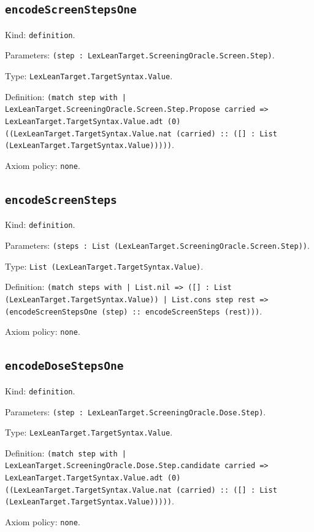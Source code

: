 \documentclass[11pt]{article}
\begin{document}
\subsection*{\texttt{encodeScreenStepsOne}}
\noindent Kind: \texttt{definition}.\par
\noindent Parameters: \texttt{(step : LexLeanTarget.ScreeningOracle.Screen.Step)}.\par
\noindent Type: \texttt{LexLeanTarget.TargetSyntax.Value}.\par
\noindent Definition: \texttt{(match step with | LexLeanTarget.ScreeningOracle.Screen.Step.Propose carried => LexLeanTarget.TargetSyntax.Value.adt (0) ((LexLeanTarget.TargetSyntax.Value.nat (carried) :: ([] : List (LexLeanTarget.TargetSyntax.Value)))))}.\par
\noindent Axiom policy: \texttt{none}.\par
\subsection*{\texttt{encodeScreenSteps}}
\noindent Kind: \texttt{definition}.\par
\noindent Parameters: \texttt{(steps : List (LexLeanTarget.ScreeningOracle.Screen.Step))}.\par
\noindent Type: \texttt{List (LexLeanTarget.TargetSyntax.Value)}.\par
\noindent Definition: \texttt{(match steps with | List.nil => ([] : List (LexLeanTarget.TargetSyntax.Value)) | List.cons step rest => (encodeScreenStepsOne (step) :: encodeScreenSteps (rest)))}.\par
\noindent Axiom policy: \texttt{none}.\par
\subsection*{\texttt{encodeDoseStepsOne}}
\noindent Kind: \texttt{definition}.\par
\noindent Parameters: \texttt{(step : LexLeanTarget.ScreeningOracle.Dose.Step)}.\par
\noindent Type: \texttt{LexLeanTarget.TargetSyntax.Value}.\par
\noindent Definition: \texttt{(match step with | LexLeanTarget.ScreeningOracle.Dose.Step.candidate carried => LexLeanTarget.TargetSyntax.Value.adt (0) ((LexLeanTarget.TargetSyntax.Value.nat (carried) :: ([] : List (LexLeanTarget.TargetSyntax.Value)))))}.\par
\noindent Axiom policy: \texttt{none}.\par
\end{document}
